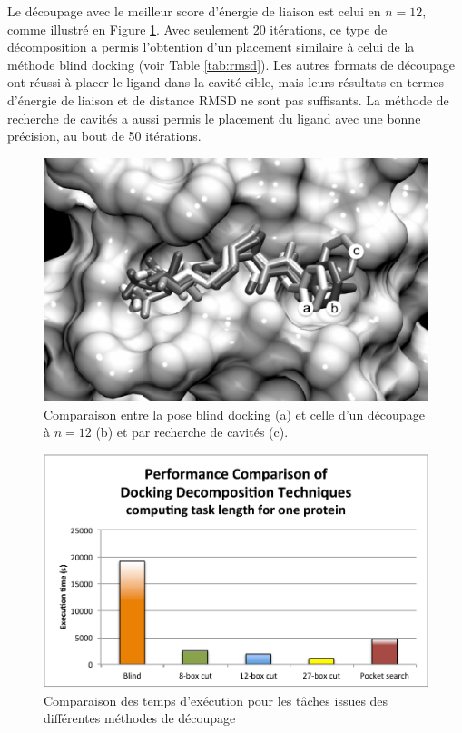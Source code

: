 Le découpage avec le meilleur score d'énergie de liaison est celui en $n = 12$, comme illustré en Figure \ref{fig:cuts}. Avec seulement 20 itérations, ce type de décomposition a permis l'obtention d'un placement similaire à celui de la méthode blind docking (voir Table \ref{tab:rmsd}). Les autres formats de découpage ont réussi à placer le ligand dans la cavité cible, mais leurs résultats en termes d'énergie de liaison et de distance RMSD ne sont pas suffisants. La méthode de recherche de cavités a aussi permis le placement du ligand avec une bonne précision, au bout de 50 itérations. 


 
 \begin{figure}[h]
 	\centering
 		\includegraphics[width=0.85\linewidth]{images/Romain/fig5-bw} 
 		\caption{Comparaison entre la pose blind docking (a) et celle d'un découpage à $n=12$ (b) et par recherche de cavités (c). }\label{fig:cuts} %
 \end{figure}

\begin{figure}
	\centering
		\includegraphics[width=0.5\linewidth]{images/Romain/fig7-color}
		\caption{Comparaison des temps d'exécution pour les tâches issues des différentes méthodes de découpage}\label{fig:performance} %

\end{figure}

